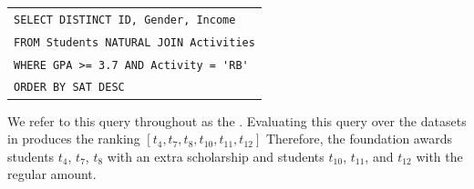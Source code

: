 \begin{example}
    \begin{center}
    \footnotesize
    \begin{tabular}{l}
        \verb"SELECT DISTINCT ID, Gender, Income "\\
        \verb"FROM Students NATURAL JOIN Activities"\\
        \verb"WHERE GPA >= 3.7 AND Activity = 'RB'"\\
        \verb"ORDER BY SAT DESC"\\
    \end{tabular}
    \end{center}
    We refer to this query throughout as the \running{}. Evaluating this query over the datasets in  produces the ranking $[t_4, t_7, t_8, t_{10}, t_{11}, t_{12}]$ %
    Therefore, the foundation awards students $t_4$, $t_7$, $t_8$ with an extra scholarship and students $t_{10}$, $t_{11}$, and $t_{12}$ with the regular amount.
\end{example}



